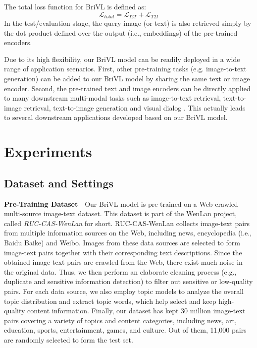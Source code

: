 \documentclass[10pt,twocolumn,letterpaper]{article}
\begin{document}
The total loss function for BriVL is defined as:
\begin{equation}
\mathcal{L}_{total} = \mathcal{L}_{I2T} + \mathcal{L}_{T2I}
\end{equation}
In the test/evaluation stage, the query image (or text) is also retrieved simply by the dot product defined over the output (i.e., embeddings) of the pre-trained encoders.

Due to its high flexibility, our BriVL model can be readily deployed in a wide range of application scenarios. First, other pre-training tasks (e.g. image-to-text generation) can be added to our BriVL model by sharing the same text or image encoder. Second, the pre-trained text and image encoders can be directly applied to many downstream multi-modal tasks such as image-to-text retrieval, text-to-image retrieval, text-to-image generation \cite{reed2016generative} and visual dialog \cite{niu2019recursive}. This actually leads to several downstream applications developed based on our BriVL model.

\section{Experiments}

\subsection{Dataset and Settings}

\noindent\textbf{Pre-Training Dataset}~~Our BriVL model is pre-trained on a Web-crawled multi-source image-text dataset. This dataset is part of the WenLan project, called \emph{RUC-CAS-WenLan} for short. RUC-CAS-WenLan collects image-text pairs from multiple information sources on the Web, including news, encyclopedia (i.e., Baidu Baike) and Weibo. Images from these data sources are selected to form image-text pairs together with their corresponding text descriptions. Since the obtained image-text pairs are crawled from the Web, there exist much noise in the original data. Thus, we then perform an elaborate cleaning process (e.g., duplicate and sensitive information detection) to filter out sensitive or low-quality pairs. For each data source, we also employ topic models to analyze the overall topic distribution and extract topic words, which help select and keep high-quality content information.
Finally, our dataset has kept 30 million image-text pairs covering a variety of topics and content categories, including news, art, education, sports, entertainment, games, and culture. Out of them, 11,000 pairs are randomly selected to form the test set.
\end{document}
